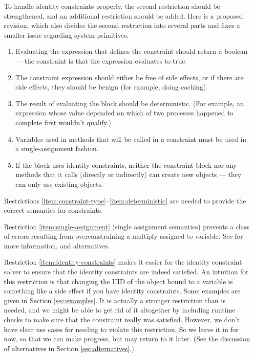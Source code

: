 \documentclass{article}
\begin{document}
To handle identity constraints properly, the second restriction should
be strengthened, and an additional restriction should be added.  Here
is a proposed revision, which also divides the second restriction into
several parts and fixes a smaller issue regarding system primitives.

\begin{enumerate}

\item \label{item:constraint-type} Evaluating the expression that
  defines the constraint should return a boolean --- the constraint is
  that the expression evaluates to true.

\item \label{item:side-effects} The constraint expression should
  either be free of side effects, or if there are side effects, they
  should be benign (for example, doing caching).

\item \label{item:deterministic} The result of evaluating the block
  should be deterministic.  (For example, an expression whose value
  depended on which of two processes happened to complete first
  wouldn't qualify.)

\item \label{item:single-assignment} Variables used in methods that
  will be called in a constraint must be used in a single-assignment
  fashion.

\item \label{item:identity-constraints} If the block uses identity
  constraints, neither the constraint block nor any methods that it
  calls (directly or indirectly) can create new objects --- they can
  only use existing objects.

\end{enumerate}

Restrictions \ref{item:constraint-type}--\ref{item:deterministic} are
needed to provide the correct semantics for constraints.

Restriction \ref{item:single-assignment} (single assignment semantics)
prevents a class of errors resulting from overconstraining a
multiply-assigned-to variable.  See \cite{felgentreff-babelsberg-tr}
for more information, and alternatives.

Restriction \ref{item:identity-constraints} makes it easier for the
identity constraint solver to ensure that the identity constraints are
indeed satisfied.  An intuition for this restriction is that changing
the UID of the object bound to a variable is something like a side
effect if you have identity constraints.  Some examples are given in
Section \ref{sec:examples}.  It is actually a stronger restriction
than is needed, and we might be able to get rid of it altogether by
including runtime checks to make sure that the constraint really was
satisfied.  However, we don't have clear use cases for needing to
violate this restriction.  So we leave it in for now, so that we can
make progress, but may return to it later.  (See the discussion of
alternatives in Section \ref{sec:alternatives}.)
\end{document}
